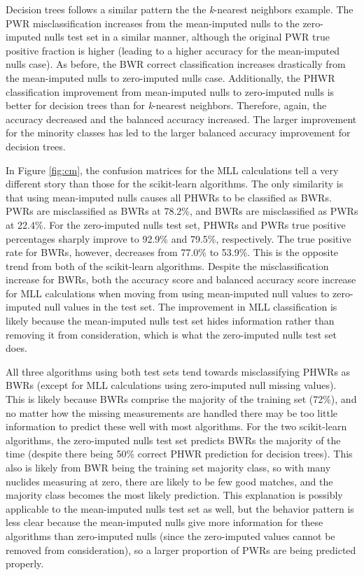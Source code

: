 Decision trees follows a similar pattern the the \textit{k}-nearest neighbors
example.  The \gls{PWR} misclassification increases from the mean-imputed nulls
to the zero-imputed nulls test set in a similar manner, although the original
\gls{PWR} true positive fraction is higher (leading to a higher accuracy for
the mean-imputed nulls case).  As before, the \gls{BWR} correct classification
increases drastically from the mean-imputed nulls to zero-imputed nulls case.
Additionally, the \gls{PHWR} classification improvement from mean-imputed nulls
to zero-imputed nulls is better for decision trees than for \textit{k}-nearest
neighbors.  Therefore, again, the accuracy decreased and the balanced accuracy
increased.  The larger improvement for the minority classes has led to the
larger balanced accuracy improvement for decision trees.

In Figure \ref{fig:cm}, the confusion matrices for the \gls{MLL} calculations
tell a very different story than those for the scikit-learn algorithms.  The
only similarity is that using mean-imputed nulls causes all \gls{PHWR}s to be
classified as \gls{BWR}s. \gls{PWR}s are misclassified as \gls{BWR}s at 78.2\%,
and \gls{BWR}s are misclassified as \gls{PWR}s at 22.4\%. For the zero-imputed
nulls test set, \gls{PHWR}s and \gls{PWR}s true positive percentages sharply
improve to 92.9\% and 79.5\%, respectively.  The true positive rate for
\gls{BWR}s, however, decreases from 77.0\% to 53.9\%. This is the opposite
trend from both of the scikit-learn algorithms.  Despite the misclassification
increase for \gls{BWR}s, both the accuracy score and balanced accuracy score
increase for \gls{MLL} calculations when moving from using mean-imputed null
values to zero-imputed null values in the test set. The improvement in
\gls{MLL} classification is likely because the mean-imputed nulls test set
hides information rather than removing it from consideration, which is what the
zero-imputed nulls test set does. 

All three algorithms using both test sets tend towards misclassifying
\gls{PHWR}s as \gls{BWR}s (except for \gls{MLL} calculations using zero-imputed
null missing values).  This is likely because \gls{BWR}s comprise the majority
of the training set (72\%), and no matter how the missing measurements are
handled there may be too little information to predict these well with most
algorithms.  For the two scikit-learn algorithms, the zero-imputed nulls test
set predicts \gls{BWR}s the majority of the time (despite there being 50\%
correct \gls{PHWR} prediction for decision trees). This also is likely from
\gls{BWR} being the training set majority class, so with many nuclides
measuring at zero, there are likely to be few good matches, and the majority
class becomes the most likely prediction. This explanation is possibly
applicable to the mean-imputed nulls test set as well, but the behavior pattern
is less clear because the mean-imputed nulls give more information for these
algorithms than zero-imputed nulls (since the zero-imputed values cannot be
removed from consideration), so a larger proportion of \gls{PWR}s are being
predicted properly.  

